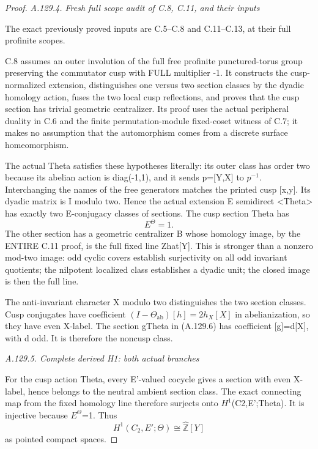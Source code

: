 \begin{proof}
\par\smallskip\noindent\emph{A.129.4. Fresh full scope audit of C.8, C.11, and their inputs}

The exact previously proved inputs are C.5--C.8 and C.11--C.13, at their full profinite scopes.

C.8 assumes an outer involution of the full free profinite punctured-torus group preserving the commutator cusp with FULL multiplier -1. It constructs the cusp-normalized extension, distinguishes one versus two section classes by the dyadic homology action, fuses the two local cusp reflections, and proves that the cusp section has trivial geometric centralizer. Its proof uses the actual peripheral duality in C.6 and the finite permutation-module fixed-coset witness of C.7; it makes no assumption that the automorphism comes from a discrete surface homeomorphism.

The actual Theta satisfies these hypotheses literally: its outer class has order two because its abelian action is diag(-1,1), and it sends p=[Y,X] to \(p^{-1}\). Interchanging the names of the free generators matches the printed cusp [x,y]. Its dyadic matrix is I modulo two. Hence the actual extension E semidirect <Theta> has exactly two E-conjugacy classes of sections. The cusp section Theta has
\[
 \boxed{E^\Theta=1.}
\tag{A.129.14}
\]
The other section has a geometric centralizer B whose homology image, by the ENTIRE C.11 proof, is the full fixed line Zhat[Y]. This is stronger than a nonzero mod-two image: odd cyclic covers establish surjectivity on all odd invariant quotients; the nilpotent localized class establishes a dyadic unit; the closed image is then the full line.

The anti-invariant character X modulo two distinguishes the two section classes. Cusp conjugates have coefficient \((I-\Theta_{\mathrm{ab}})[h]=2h_X[X]\) in abelianization, so they have even X-label. The section gTheta in (A.129.6) has coefficient [g]=d[X], with d odd. It is therefore the noncusp class.

\par\smallskip\noindent\emph{A.129.5. Complete derived H1: both actual branches}

For the cusp action Theta, every E'-valued cocycle gives a section with even X-label, hence belongs to the neutral ambient section class. The exact connecting map from the fixed homology line therefore surjects onto \(H^1\)(C2,E';Theta). It is injective because \(E^\Theta\)=1. Thus
\[
 \boxed{H^1(C_2,E';\Theta)\cong\widehat{\mathbb Z}[Y]}
\tag{A.129.15}
\]
as pointed compact spaces.


\end{proof}
